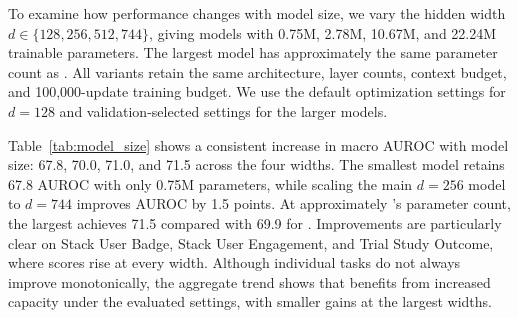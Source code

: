 To examine how performance changes with model size, we vary the hidden width
$d\in\{128,256,512,744\}$, giving models with 0.75M, 2.78M, 10.67M, and
22.24M trainable parameters. The largest model has approximately the same
parameter count as \RT{}. All variants retain the same architecture, layer
counts, context budget, and 100,000-update training budget. We use the default
optimization settings for $d=128$ and validation-selected settings for the
larger models.

Table~\ref{tab:model_size} shows a consistent increase in macro AUROC with
model size: 67.8, 70.0, 71.0, and 71.5 across the four widths. The smallest
model retains 67.8 AUROC with only 0.75M parameters, while scaling the main
$d=256$ model to $d=744$ improves AUROC by 1.5 points. At approximately
\RT{}'s parameter count, the largest \model{} achieves 71.5 compared with
69.9 for \RT{}. Improvements are particularly clear on Stack User Badge,
Stack User Engagement, and Trial Study Outcome, where scores rise at every
width. Although individual tasks do not always improve monotonically, the
aggregate trend shows that \model{} benefits from increased capacity under
the evaluated settings, with smaller gains at the largest widths.

